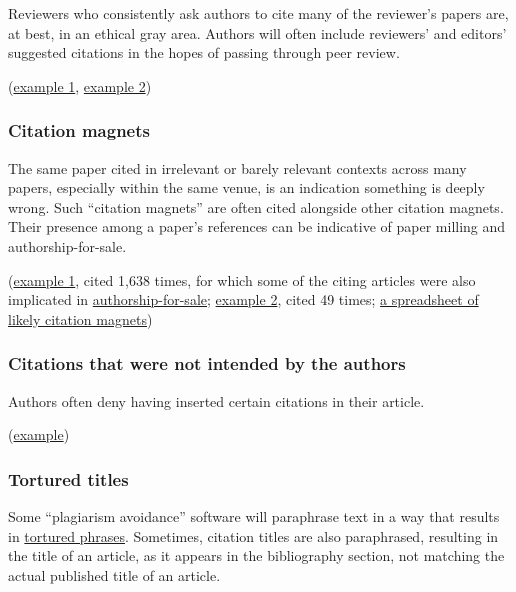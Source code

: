 \documentclass[letterpaper, 12pt]{article}
\begin{document}
Reviewers who consistently ask authors to cite many of the reviewer's papers are, at best, in an ethical gray area. Authors will often include reviewers' and editors' suggested citations in the hopes of passing through peer review.

(\href{https://pubpeer.com/publications/90719DBC6E5FF2AC32FDE74F1A6A7F}{example 1}, \href{https://pubpeer.com/publications/1924F147DE045B97261004EB2387AE}{example 2})

\subsubsection*{Citation magnets}

The same paper cited in irrelevant or barely relevant contexts across many papers,
especially within the same venue, is an indication something is deeply wrong.  Such ``citation magnets'' are often cited alongside other citation magnets. Their presence among a paper's references can be indicative of paper milling and authorship-for-sale.

(\href{https://pubpeer.com/search?q=%22A+novel+Aluminum%E2%80%93graphite+dual-Ion+battery%22}{example 1}, cited 1,638 times, for which some of the citing articles were also implicated in \href{https://pubpeer.com/publications/DF9A5CE25CF36DDAFF4B6695B91EA7}{authorship-for-sale}; \href{https://pubpeer.com/publications/B71DD139D3549DCCA37DCEC8AF59D5}{example 2}, cited 49 times;  \href{https://docs.google.com/spreadsheets/d/1o-9OIyzZ9mMqA7bprcbI5nemtYBfxiXH1ndI3y5A43E/edit?usp=sharing}{a spreadsheet of likely citation magnets})

\subsubsection*{Citations that were not intended by the authors}

Authors often deny having inserted certain citations in their article.

(\href{https://pubpeer.com/publications/8DC24BCCDA68EC1954E1FCA74FDB8E\#2}{example})

\subsubsection*{Tortured titles}

Some ``plagiarism avoidance'' software will paraphrase text in a way that results in \href{https://arxiv.org/abs/2107.06751}{tortured phrases}. Sometimes, citation titles are also paraphrased, resulting in the title of an article, as it appears in the bibliography section, not matching the actual published title of an article.
\end{document}
